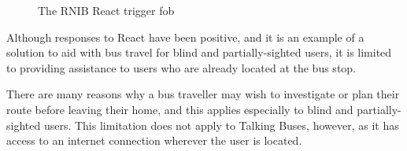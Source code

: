 \documentclass[10pt,twocolumn]{article}
\newcommand{\citep}[1]{}
\begin{document}
\begin{description}
\begin{figure}[htbp]
\centering
    \begin{minipage}[b]{0.3\linewidth}
  \centering
          \end{minipage}
    \caption{The RNIB React trigger fob}
    \label{fig:fob}
\end{figure}

Although responses to React have been positive\citep{reactEdinburgh}, and it is an example of a solution to aid with bus travel for blind and partially-sighted users, it is limited to providing assistance to users who are already located at the bus stop.

There are many reasons why a bus traveller may wish to investigate or plan their route before leaving their home, and this applies especially to blind and partially-sighted users\citep{stopForMe}. This limitation does not apply to Talking Buses, however, as it has access to an internet connection wherever the user is located.


\end{description}
\end{document}
